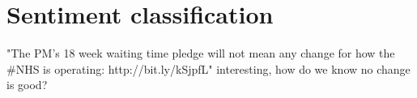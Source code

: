 \chapter{Sentiment classification}
\label{sentiment}

"The PM's 18 week waiting time pledge will not mean any change for how the #NHS is operating: http://bit.ly/kSjpfL" interesting, how do we know no change is good?